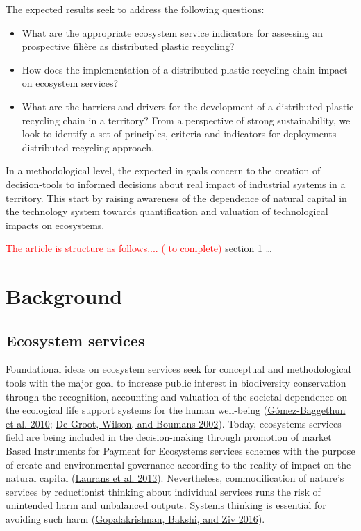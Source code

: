 \documentclass[
  14pt,
]{extarticle}
\providecommand{\tightlist}{%
  \setlength{\itemsep}{0pt}\setlength{\parskip}{0pt}}
\def\tightlist{}
\begin{document}
The expected results seek to address the following questions:

\begin{itemize}
\tightlist
\item
  What are the appropriate ecosystem service indicators for assessing an prospective filière as distributed plastic recycling?
\item
  How does the implementation of a distributed plastic recycling chain impact on ecosystem services?
\item
  What are the barriers and drivers for the development of a distributed plastic recycling chain in a territory?
  From a perspective of strong sustainability, we look to identify a set of principles, criteria and indicators for deployments distributed recycling approach,
\end{itemize}

In a methodological level, the expected in goals concern to the creation of decision-tools to informed decisions about real impact of industrial systems in a territory.
This start by raising awareness of the dependence of natural capital in the technology system towards quantification and valuation of technological impacts on ecosystems.

\textcolor{red}{The article is structure as follows.... ( to complete) } section \ref{background} \ldots{}

\hypertarget{background}{%
\section{Background}\label{background}}

\label{background}

\hypertarget{ecosystem-services}{%
\subsection{Ecosystem services}\label{ecosystem-services}}

Foundational ideas on ecosystem services seek for conceptual and methodological tools with the major goal to increase public interest in biodiversity conservation through the recognition, accounting and valuation of the societal dependence on the ecological life support systems for the human well-being (\protect\hyperlink{ref-Gomez-Baggethun2010}{Gómez-Baggethun et al. 2010}; \protect\hyperlink{ref-DeGroot2002}{De Groot, Wilson, and Boumans 2002}).
Today, ecosystems services field are being included in the decision-making through promotion of market Based Instruments for Payment for Ecosystems services schemes with the purpose of create and environmental governance according to the reality of impact on the natural capital (\protect\hyperlink{ref-Laurans2013}{Laurans et al. 2013}).
Nevertheless, commodification of nature's services by reductionist thinking about individual services runs the risk of unintended harm and unbalanced outputs.
Systems thinking is essential for avoiding such harm (\protect\hyperlink{ref-Gopalakrishnan2016}{Gopalakrishnan, Bakshi, and Ziv 2016}).
\end{document}
